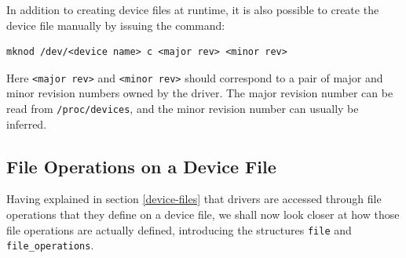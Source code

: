 In addition to creating device files at runtime, it is also possible to create the device file manually by issuing the command:
\lstset{style=lststyle-terminal}
\begin{lstlisting}
mknod /dev/<device name> c <major rev> <minor rev>
\end{lstlisting}
Here \texttt{<major rev>} and \texttt{<minor rev>} should correspond to a pair of major and minor revision numbers owned by the driver. The major revision number can be read from \texttt{/proc/devices}, and the minor revision number can usually be inferred.

\subsection{File Operations on a Device File}
Having explained in section \ref{device-files} that drivers are accessed through file operations that they define on a device file, we shall now look closer at how those file operations are actually defined, introducing the structures \texttt{file} and \texttt{file\_operations}.

